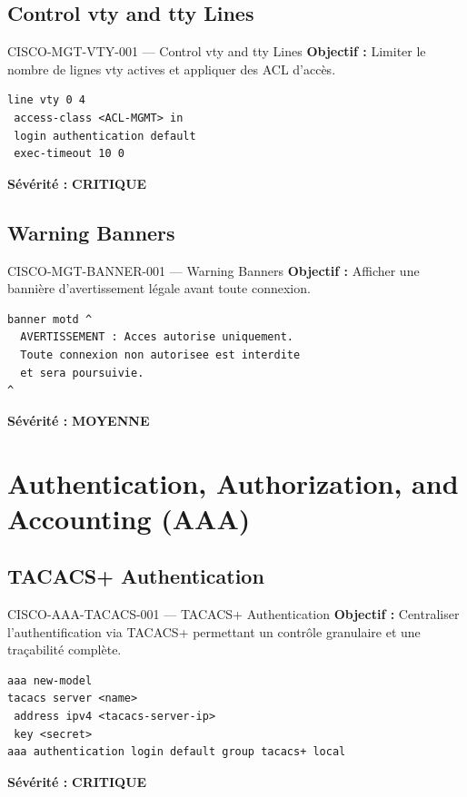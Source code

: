\documentclass[12pt, a4paper]{report}
\begin{document}
\subsection{Control vty and tty Lines}

\begin{rulebox}{CISCO-MGT-VTY-001 — Control vty and tty Lines}
  \textbf{Objectif :} Limiter le nombre de lignes vty actives et appliquer des ACL d'accès.

  \begin{lstlisting}
line vty 0 4
 access-class <ACL-MGMT> in
 login authentication default
 exec-timeout 10 0
  \end{lstlisting}

  \textbf{Sévérité :} \textcolor{accentRed}{\textbf{CRITIQUE}}
\end{rulebox}

\subsection{Warning Banners}

\begin{rulebox}{CISCO-MGT-BANNER-001 — Warning Banners}
  \textbf{Objectif :} Afficher une bannière d'avertissement légale avant toute connexion.

  \begin{lstlisting}
banner motd ^
  AVERTISSEMENT : Acces autorise uniquement.
  Toute connexion non autorisee est interdite
  et sera poursuivie.
^
  \end{lstlisting}

  \textbf{Sévérité :} \textcolor{accentGreen}{\textbf{MOYENNE}}
\end{rulebox}

\section{Authentication, Authorization, and Accounting (AAA)}

\subsection{TACACS+ Authentication}

\begin{rulebox}{CISCO-AAA-TACACS-001 — TACACS+ Authentication}
  \textbf{Objectif :} Centraliser l'authentification via TACACS+ permettant un contrôle granulaire et une traçabilité complète.

  \begin{lstlisting}
aaa new-model
tacacs server <name>
 address ipv4 <tacacs-server-ip>
 key <secret>
aaa authentication login default group tacacs+ local
  \end{lstlisting}

  \textbf{Sévérité :} \textcolor{accentRed}{\textbf{CRITIQUE}}
\end{rulebox}
\end{document}
